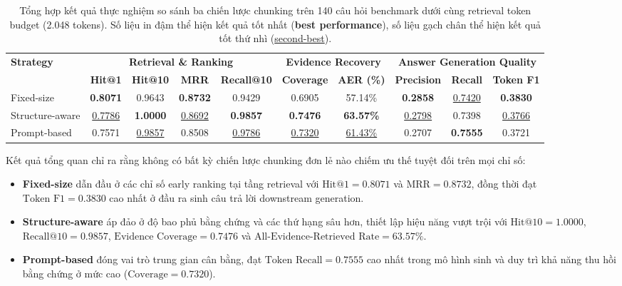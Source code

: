 \begin{table}[t]
\centering
\small
\setlength{\tabcolsep}{4.5pt}
\begin{tabular}{lccccccccc}
\toprule
\multirow{2}{*}{\textbf{Strategy}} & \multicolumn{4}{c}{\textbf{Retrieval \& Ranking}} & \multicolumn{2}{c}{\textbf{Evidence Recovery}} & \multicolumn{3}{c}{\textbf{Answer Generation Quality}} \\
\cmidrule(lr){2-5} \cmidrule(lr){6-7} \cmidrule(lr){8-10}
& \textbf{Hit@1} & \textbf{Hit@10} & \textbf{MRR} & \textbf{Recall@10} & \textbf{Coverage} & \textbf{AER (\%)} & \textbf{Precision} & \textbf{Recall} & \textbf{Token F1} \\
\midrule
Fixed-size & \textbf{0.8071} & 0.9643 & \textbf{0.8732} & 0.9429 & 0.6905 & 57.14\% & \textbf{0.2858} & \underline{0.7420} & \textbf{0.3830} \\
Structure-aware & \underline{0.7786} & \textbf{1.0000} & \underline{0.8692} & \textbf{0.9857} & \textbf{0.7476} & \textbf{63.57\%} & \underline{0.2798} & 0.7398 & \underline{0.3766} \\
Prompt-based & 0.7571 & \underline{0.9857} & 0.8508 & \underline{0.9786} & \underline{0.7320} & \underline{61.43\%} & 0.2707 & \textbf{0.7555} & 0.3721 \\
\bottomrule
\end{tabular}
\caption{Tổng hợp kết quả thực nghiệm so sánh ba chiến lược chunking trên 140 câu hỏi benchmark dưới cùng retrieval token budget (2.048 tokens). Số liệu in đậm thể hiện kết quả tốt nhất (\textbf{best performance}), số liệu gạch chân thể hiện kết quả tốt thứ nhì (\underline{second-best}).}
\label{tab:main_results}
\end{table}

Kết quả tổng quan chỉ ra rằng không có bất kỳ chiến lược chunking đơn lẻ nào chiếm ưu thế tuyệt đối trên mọi chỉ số:
\begin{itemize}
    \item \textbf{Fixed-size} dẫn đầu ở các chỉ số early ranking tại tầng retrieval với $\text{Hit@1} = 0.8071$ và $\text{MRR} = 0.8732$, đồng thời đạt $\text{Token F1} = 0.3830$ cao nhất ở đầu ra sinh câu trả lời downstream generation.
    \item \textbf{Structure-aware} áp đảo ở độ bao phủ bằng chứng và các thứ hạng sâu hơn, thiết lập hiệu năng vượt trội với $\text{Hit@10} = 1.0000$, $\text{Recall@10} = 0.9857$, $\text{Evidence Coverage} = 0.7476$ và $\text{All-Evidence-Retrieved Rate} = 63.57\%$.
    \item \textbf{Prompt-based} đóng vai trò trung gian cân bằng, đạt $\text{Token Recall} = 0.7555$ cao nhất trong mô hình sinh và duy trì khả năng thu hồi bằng chứng ở mức cao ($\text{Coverage} = 0.7320$).
\end{itemize}

